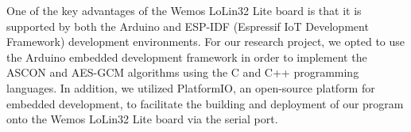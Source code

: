 One of the key advantages of the Wemos LoLin32 Lite board is that it is supported by both the Arduino and ESP-IDF (Espressif IoT Development Framework) development environments. For our research project, we opted to use the Arduino embedded development framework in order to implement the ASCON and AES-GCM algorithms using the C and C++ programming languages. In addition, we utilized PlatformIO, an open-source platform for embedded development, to facilitate the building and deployment of our program onto the Wemos LoLin32 Lite board via the serial port.
